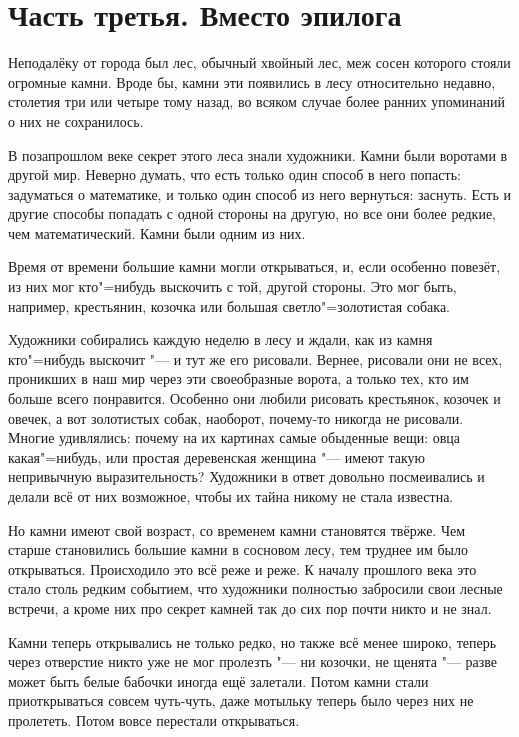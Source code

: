 \chapter*{Часть третья. Вместо эпилога}

Неподалёку от города был лес, обычный хвойный лес, меж сосен которого стояли
огромные камни.
Вроде бы, камни эти появились в лесу относительно недавно, столетия три или
четыре тому назад, во всяком случае более ранних упоминаний о них не сохранилось.

В позапрошлом веке секрет этого леса знали художники.
Камни были воротами в другой мир.
Неверно думать, что есть только один способ в него попасть: задуматься о
математике, и только один способ из него вернуться: заснуть.
Есть и другие способы попадать с одной стороны на другую, но все они более
редкие, чем математический.
Камни были одним из них.

Время от времени большие камни могли открываться, и, если особенно повезёт, из
них мог кто"=нибудь выскочить с той, другой стороны.
Это мог быть, например, крестьянин, козочка или большая светло"=золотистая
собака.

Художники собирались каждую неделю в лесу и ждали, как из камня кто"=нибудь
выскочит "--- и тут же его рисовали.
Вернее, рисовали они не всех, проникших в наш мир через эти своеобразные ворота,
а только тех, кто им больше всего понравится.
Особенно они любили рисовать крестьянок, козочек и овечек, а вот золотистых
собак, наоборот, почему-то никогда не рисовали.
Многие удивлялись: почему на их картинах самые обыденные вещи: овца
какая"=нибудь, или простая деревенская женщина "--- имеют такую непривычную
выразительность?
Художники в ответ довольно посмеивались и делали всё от них возможное, чтобы их
тайна никому не стала известна.

Но камни имеют свой возраст, со временем камни становятся твёрже.
Чем старше становились большие камни в сосновом лесу, тем труднее им было
открываться.
Происходило это всё реже и реже.
К началу прошлого века это стало столь редким событием, что художники полностью
забросили свои лесные встречи, а кроме них про секрет камней так до сих пор
почти никто и не знал.

Камни теперь открывались не только редко, но также всё менее широко, теперь
через отверстие никто уже не мог пролезть "--- ни козочки, не щенята "--- разве
может быть белые бабочки иногда ещё залетали.
Потом камни стали приоткрываться совсем чуть-чуть, даже мотыльку теперь было
через них не пролететь.
Потом вовсе перестали открываться.

